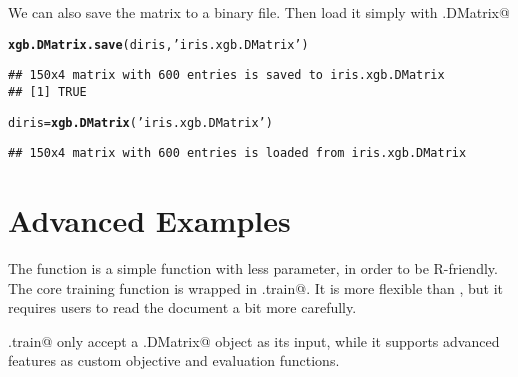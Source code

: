 \documentclass{article}\usepackage[]{graphicx}\usepackage[]{color}
\makeatletter
\newcommand{\hlstr}[1]{\textcolor[rgb]{0.192,0.494,0.8}{#1}}%
\newcommand{\hlstd}[1]{\textcolor[rgb]{0.345,0.345,0.345}{#1}}%
\newcommand{\hlkwb}[1]{\textcolor[rgb]{0.69,0.353,0.396}{#1}}%
\newcommand{\hlkwd}[1]{\textcolor[rgb]{0.737,0.353,0.396}{\textbf{#1}}}%
\newenvironment{kframe}{%
 \def\at@end@of@kframe{}%
 \ifinner\ifhmode%
  \def\at@end@of@kframe{\end{minipage}}%
  \begin{minipage}{\columnwidth}%
 \fi\fi%
 \def\FrameCommand##1{\hskip\@totalleftmargin \hskip-\fboxsep
 \colorbox{shadecolor}{##1}\hskip-\fboxsep
     \hskip-\linewidth \hskip-\@totalleftmargin \hskip\columnwidth}%
 \MakeFramed {\advance\hsize-\width
   \@totalleftmargin\z@ \linewidth\hsize
   \@setminipage}}%
 {\par\unskip\endMakeFramed%
 \at@end@of@kframe}
\newenvironment{knitrout}{}{} %
\makeatother
\begin{document}
We can also save the matrix to a binary file. Then load it simply with 
\verb@xgb.DMatrix@
\begin{knitrout}
\color{fgcolor}\begin{kframe}
\begin{alltt}
\hlkwd{xgb.DMatrix.save}\hlstd{(diris,} \hlstr{'iris.xgb.DMatrix'}\hlstd{)}
\end{alltt}
\begin{verbatim}
## 150x4 matrix with 600 entries is saved to iris.xgb.DMatrix
## [1] TRUE
\end{verbatim}
\begin{alltt}
\hlstd{diris} \hlkwb{=} \hlkwd{xgb.DMatrix}\hlstd{(}\hlstr{'iris.xgb.DMatrix'}\hlstd{)}
\end{alltt}
\begin{verbatim}
## 150x4 matrix with 600 entries is loaded from iris.xgb.DMatrix
\end{verbatim}
\end{kframe}
\end{knitrout}

\section{Advanced Examples}

The function \verb@xgboost@ is a simple function with less parameter, in order
to be R-friendly. The core training function is wrapped in \verb@xgb.train@. It is more flexible than \verb@xgboost@, but it requires users to read the document a bit more carefully.

\verb@xgb.train@ only accept a \verb@xgb.DMatrix@ object as its input, while it supports advanced features as custom objective and evaluation functions.
\end{document}
